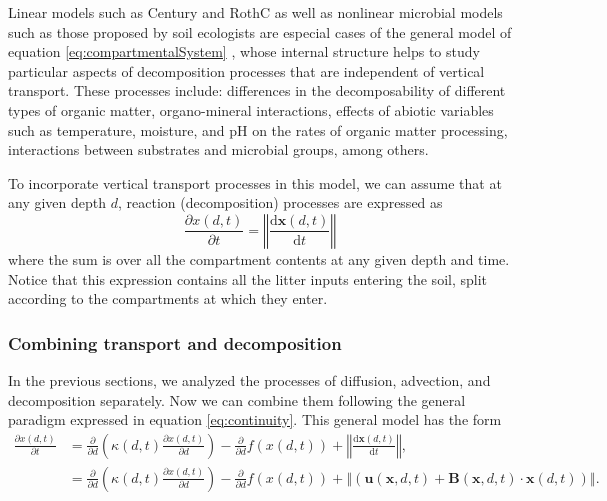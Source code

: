 \documentclass[11pt, oneside, a4paper]{article}   	%
\begin{document}
Linear models such as Century and RothC as well as nonlinear microbial models such as those proposed by soil ecologists \citep[e.g][]{Schimel2003, Allison2010} are especial cases of the general model of equation \ref{eq:compartmentalSystem} \citep{Sierra2015EM}, whose internal structure helps to study particular aspects of decomposition processes that are independent of vertical transport. These processes include: differences in the decomposability of different types of organic matter, organo-mineral interactions, effects of abiotic variables such as temperature, moisture, and pH on the rates of organic matter processing, interactions between substrates and microbial groups, among others. 

To incorporate vertical transport processes in this model, we can assume that at any given depth $d$, reaction (decomposition) processes are expressed as
\begin{equation}
\frac{\partial x(d, t)}{\partial t} = \left\Vert \frac{\mathrm{d} \bm{x}(d, t)}{\mathrm{d} t} \right\Vert
\end{equation}
where the sum is over all the compartment contents at any given depth and time. Notice that this expression contains all the litter inputs entering the soil, split according to the compartments at which they enter. 

\subsubsection{Combining transport and decomposition}
In the previous sections, we analyzed the processes of diffusion, advection, and decomposition separately. Now we can combine them following the general paradigm expressed in equation \ref{eq:continuity}. This general model has the form
\begin{equation} \label{eq:generalTransport}
\begin{aligned}
\frac{\partial x(d, t)}{\partial t} &= \frac{\partial}{\partial d} \left( \kappa(d, t) \frac{\partial x(d, t)}{\partial d} \right) 
                                                  - \frac{\partial }{\partial d} f(x(d, t))
                                                  + \left\Vert \frac{\mathrm{d} \bm{x}(d, t)}{\mathrm{d} t} \right\Vert, \\
 &=  \frac{\partial}{\partial d} \left( \kappa(d, t) \frac{\partial x(d, t)}{\partial d} \right) 
                                                  - \frac{\partial }{\partial d} f(x(d, t))
                                                  + \left\Vert \left( \bm{u}(\bm{x}, d, t) + \mathbf{B}(\bm{x}, d, t) \cdot \bm{x}(d, t)  \right) \right\Vert.
\end{aligned}
\end{equation}
\end{document}
